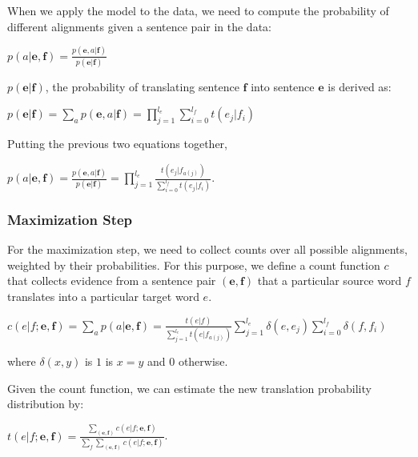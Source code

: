 \documentclass[11pt]{report}
\theoremstyle{plain}
\begin{document}
{When we apply the model to the data, we need to compute the
probability of different alignments given a sentence pair in the
data:
\vspace{-1mm}
\begin{center}
$p(a|\textbf{e},\textbf{f}) =
\frac{p(\textbf{e},a|\textbf{f})}{p(\textbf{e}|\textbf{f})}$
\end{center}

$p(\textbf{e}|\textbf{f})$, the probability of translating sentence
$\textbf{f}$ into sentence $\textbf{e}$ is derived as:
\vspace{-1mm}
\begin{center}
$p(\textbf{e}|\textbf{f}) = \sum_a p(\textbf{e},a|\textbf{f}) =
\prod_{j=1}^{l_e} \sum_{i=0}^{l_f}t(e_j|f_i)$
\end{center}

Putting the previous two equations together,
\vspace{-1mm}
\begin{center}
 $p(a|\textbf{e},\textbf{f}) =
\frac{p(\textbf{e},a|\textbf{f})}{p(\textbf{e}|\textbf{f})}
=\prod_{j=1}^{l_e} \frac {t(e_j | f_{a(j)})}{\sum_{i=0}^{l_f}
t(e_j|f_i)}$.
\end{center}

\subsubsection{Maximization Step}

For the maximization step, we need to collect counts over all
possible alignments, weighted by their probabilities. For this
purpose, we define a count function $c$ that collects evidence from
a sentence pair $(\textbf{e},\textbf{f})$ that a particular source
word $f$  translates into a particular target word $e$.

\begin{center}

$c(e|f;\textbf{e},\textbf{f}) = \sum_a p(a|\textbf{e},\textbf{f}) =
\frac{t(e|f)}{\sum_{j=1}^{l_e}t(e|f_{a(j)})} \sum_{j=1}^{l_e}
\delta(e,e_j)\sum_{i=0}^{l_f}\delta(f,f_i)$

\end{center}

where $\delta(x,y)$ is $1$ is $x=y$ and $0$ otherwise.

Given the count function, we can estimate the new translation
probability distribution by:

\begin{center}
$t(e|f;\textbf{e},\textbf{f}) =
\frac{\sum_{(\textbf{e},\textbf{f})}c(e|f;\textbf{e},\textbf{f})}{\sum_f\sum_{(\textbf{e},\textbf{f})}c(e|f;\textbf{e},\textbf{f})}$.
\end{center}


}
\end{document}
